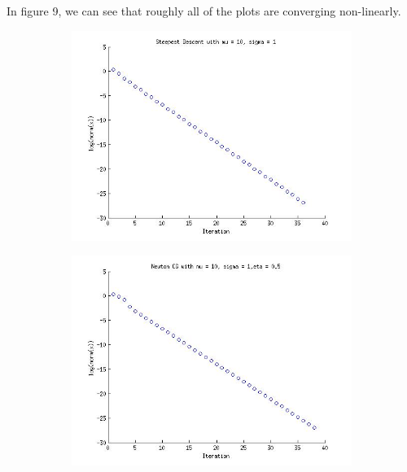 \documentclass{article}
\begin{document}
In figure 9, we can see that roughly all of the plots are converging
non-linearly. 

\begin{figure}[!htb]
        \centering
        \begin{subfigure}[bh]{0.45\textwidth}
                \includegraphics[width=\textwidth]{figs/P3SDmu10sig1.jpg}
        \end{subfigure}%
        \begin{subfigure}[bh]{0.45\textwidth}
                \includegraphics[width=\textwidth]{figs/P3NCGmu10sig1eta1.jpg}
        \end{subfigure}
        \centering
        \begin{subfigure}[bh]{0.45\textwidth}

\end{subfigure}
\end{figure}
\end{document}

